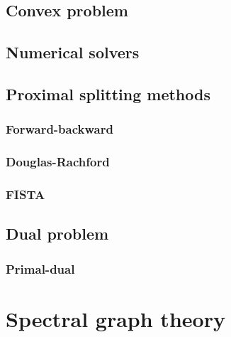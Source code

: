 \documentclass[a4paper,12pt,twoside]{report}
\begin{document}
\section{Convex problem}

\section{Numerical solvers}

\section{Proximal splitting methods}

\subsection{Forward-backward}

\subsection{Douglas-Rachford}

\subsection{FISTA}

\section{Dual problem}

\subsection{Primal-dual}

\chapter{Spectral graph theory}
\end{document}
